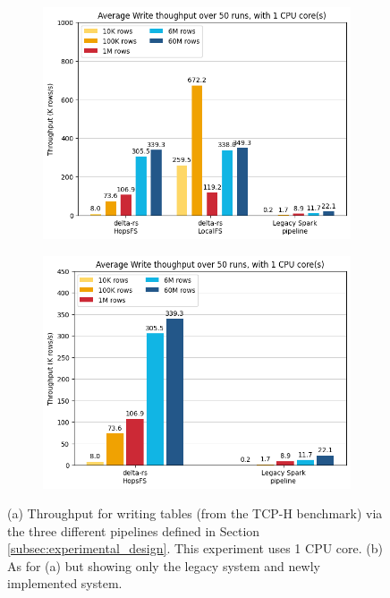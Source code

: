 \begin{figure}
    \centering
    \begin{subfigure}[b]{\textwidth}
        \includegraphics[width=\textwidth]{figures/5-results/diagram_three_tech_write_1_core.png}
       \caption{}
       \label{fig:res_writing_3}
    \end{subfigure}
    
    \begin{subfigure}[b]{\textwidth}
        \includegraphics[width=\textwidth]{figures/5-results/diagram_two_tech_write_1_core.png}
       \caption{}
       \label{fig:res_writing_2}
    \end{subfigure}
    
    \caption{(a) Throughput for writing tables (from the TCP-H benchmark) via the three different pipelines defined in Section \ref{subsec:experimental_design}. This experiment uses 1 \gls{CPU} core.
    (b) As for (a) but showing only the legacy system and newly implemented system.}
\end{figure}

